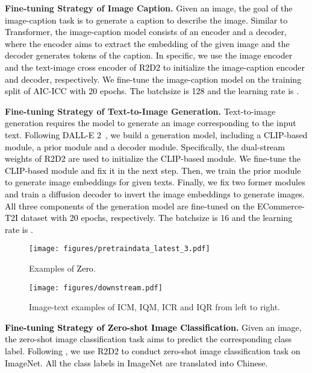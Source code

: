 \documentclass[sigconf]{acmart}
\def\jc{\textcolor{black}}
\def\blue{\textcolor{black}}
\def\mmcr{\textcolor{black}}
\begin{document}
\textbf{Fine-tuning Strategy of Image Caption.}
\jc{Given an image, the goal of the image-caption task is to generate a caption to describe the image. Similar to Transformer\cite{Transformer}, the image-caption model consists of an encoder and a decoder, where the encoder aims to extract the embedding of the given image and the decoder generates tokens of the caption. In specific, we use the image encoder and the text-image cross encoder of \mmcr{R2D2} to initialize the image-caption encoder and decoder, respectively.
We fine-tune the image-caption model on the training split of AIC-ICC \cite{aic} with 20 epochs. The batchsize is 128 and the learning rate is .
}


\textbf{Fine-tuning Strategy of Text-to-Image Generation.}
\jc{Text-to-image generation requires the model to generate an image corresponding to the input text.
Following DALL-E 2~\cite{DALLE2}, we build a generation model, including a CLIP-based module, a prior module and a decoder module. Specifically, the dual-stream weights of \mmcr{R2D2} are used to initialize the CLIP-based module. We fine-tune the CLIP-based module and fix it in the next step. Then, we train the prior module to generate image embeddings for given texts. Finally, we fix two former modules and train a diffusion decoder to invert the image embeddings to generate images. All three components of the generation model are fine-tuned on the ECommerce-T2I dataset with 20 epochs, respectively. The batchsize is 16 and the learning rate is .}


\begin{figure*}[h]
    \renewcommand\thefigure{A}
    \centering
	\texttt{[image: figures/pretraindata\_latest\_3.pdf]}
	\caption{Examples of \mmcr{Zero}.} 
	\label{fig:pretraindata}
\end{figure*}

\begin{figure*}[h]
    \renewcommand\thefigure{B}
    \centering
	\texttt{[image: figures/downstream.pdf]}
    \caption{Image-text examples of ICM, IQM, ICR and IQR from left to right.}
	\label{fig:downstream} 
\end{figure*}

\textbf{\blue{Fine-tuning Strategy of Zero-shot Image Classification.}}
\blue{Given an image, the zero-shot image classification task aims to predict the corresponding class label. Following \cite{gu2022wukong}, we use \mmcr{R2D2} to conduct zero-shot image classification task on ImageNet\cite{imagenet}. All the class labels in ImageNet are translated into Chinese.}
\end{document}
